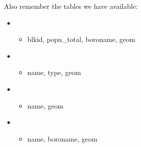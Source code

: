 \documentclass[a4paper,11pt,english]{sphinxmanual}
\begin{document}
Also remember the tables we have available:
\begin{itemize}
\item {} 
\begin{itemize}
\item {} 
blkid, popn\_total, boroname, geom

\end{itemize}

\item {} 
\begin{itemize}
\item {} 
name, type, geom

\end{itemize}

\item {} 
\begin{itemize}
\item {} 
name, geom

\end{itemize}

\item {} 
\begin{itemize}
\item {} 
name, boroname, geom

\end{itemize}

\end{itemize}
\end{document}
